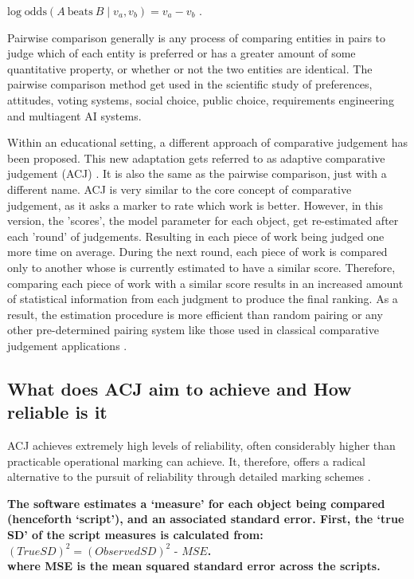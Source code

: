 	\begin{center}
		 
	$\displaystyle \mathrm {log\;odds} (A\ {\text{beats}}\ B\mid v_{a},v_{b})=v_{a}-v_{b}$ .
	
	\end{center}

	Pairwise comparison generally is any process of comparing entities in pairs to judge which of each entity is preferred or has a greater amount of some quantitative property, or whether or not the two entities are identical. The pairwise comparison method get used in the scientific study of preferences, attitudes, voting systems, social choice, public choice, requirements engineering and multiagent AI systems.
	
	Within an educational setting, a different approach of comparative judgement has been proposed. This new adaptation gets referred to as adaptive comparative judgement (ACJ) \cite{pollitt2012method}. It is also the same as the pairwise comparison, just with a different name. ACJ is very similar to the core concept of comparative judgement, as it asks a marker to rate which work is better.  However, in this version, the 'scores', the model parameter for each object, get re-estimated after each 'round' of judgements. Resulting in each piece of work being judged one more time on average. During the next round, each piece of work is compared only to another whose is currently estimated to have a similar score. Therefore, comparing each piece of work with a similar score results in an increased amount of statistical information from each judgment to produce the final ranking. As a result, the estimation procedure is more efficient than random pairing or any other pre-determined pairing system like those used in classical comparative judgement applications \cite{pollitt2012method}.
	
	\subsection{What does ACJ aim to achieve and How reliable is it}
	
	ACJ achieves extremely high levels of reliability, often considerably higher than practicable operational marking can achieve. It, therefore, offers a radical alternative to the pursuit of reliability through detailed marking schemes \cite{pollitt2012method}. 
	
	\textbf{The software estimates a ‘measure’ for each object being compared (henceforth ‘script’), and an associated standard error. First, the ‘true SD’ of the script measures is calculated from: \\
	$(True SD)^{2} = (Observed SD)^{2} \text{ - } MSE$. \\
	where MSE is the mean squared standard error across the scripts. }
	
